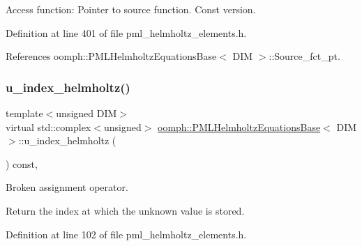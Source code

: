 Access function\+: Pointer to source function. Const version. 



Definition at line 401 of file pml\+\_\+helmholtz\+\_\+elements.\+h.



References oomph\+::\+P\+M\+L\+Helmholtz\+Equations\+Base$<$ D\+I\+M $>$\+::\+Source\+\_\+fct\+\_\+pt.

\mbox{\label{classoomph_1_1PMLHelmholtzEquationsBase_aecebb06e1f97f8ad44caa265c4bfd6eb}} 
\subsubsection{\texorpdfstring{u\+\_\+index\+\_\+helmholtz()}{u\_index\_helmholtz()}}
{\footnotesize\ttfamily template$<$unsigned D\+IM$>$ \\
virtual std\+::complex$<$unsigned$>$ \hyperlink{classoomph_1_1PMLHelmholtzEquationsBase}{oomph\+::\+P\+M\+L\+Helmholtz\+Equations\+Base}$<$ D\+IM $>$\+::u\+\_\+index\+\_\+helmholtz (\begin{DoxyParamCaption}{ }\end{DoxyParamCaption}) const\hspace{0.3cm}{\ttfamily [inline]}, {\ttfamily [virtual]}}



Broken assignment operator. 

Return the index at which the unknown value is stored. 

Definition at line 102 of file pml\+\_\+helmholtz\+\_\+elements.\+h.



